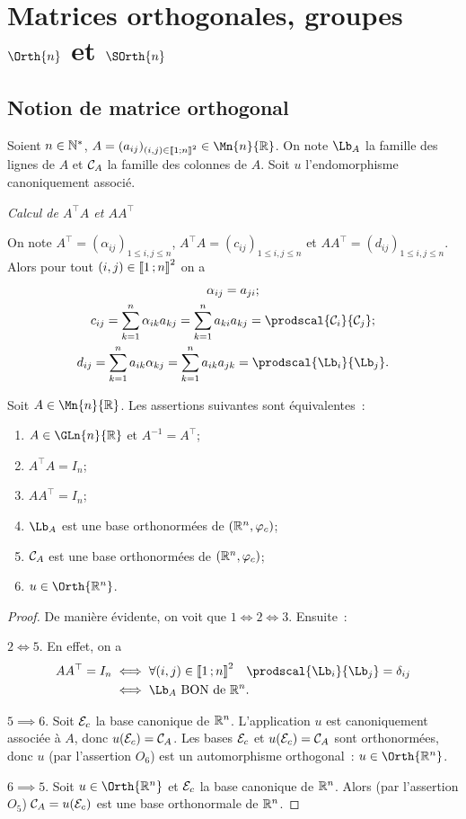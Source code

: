 \section{Matrices orthogonales, groupes $\Orth{n}$ et $\SOrth{n}$}

\subsection{Notion de matrice orthogonal}

Soient $n \in \mathbb{N}^*$, $A=(a_{ij})_{(i,j) \in \intervalleentier{1}{n}^2} \in \Mn{n}{\R}$. On note $\Lb_A$ la famille des lignes de $A$ et $\mathcal{C}_A$ la famille des colonnes de $A$. Soit $u$ l'endomorphisme canoniquement associé.

\emph{Calcul de $A^\top A$ et $A A^\top$}

On note $A^\top = (\alpha_{ij})_{1\leq i,j \leq n}$, $A^\top A= (c_{ij})_{1\leq i,j \leq n}$ et $A A^\top=(d_{ij})_{1\leq i,j \leq n}$. Alors pour tout $(i,j) \in \mathopen{\llbracket}1\mathclose{}\mathpunct{};n\mathclose{\rrbracket}^2$ on a
\begin{gather}
  \alpha_{ij}=a_{ji};\\
  c_{ij} = \sum_{k=1}^n \alpha_{ik}a_{kj}=\sum_{k=1}^n a_{ki}a_{kj} = \prodscal{\courbe_i}{\courbe_j};\\
 d_{ij} = \sum_{k=1}^n a_{ik}\alpha_{kj}=\sum_{k=1}^n a_{ik}a_{jk} = \prodscal{\Lb_i}{\Lb_j}.
\end{gather}
\begin{theo}
  Soit $A \in \Mn{n}{\R}$. Les assertions suivantes sont équivalentes~:
  \begin{enumerate}
  \item $A \in \GLn{n}{\R}$ et $A^{-1}=A^\top$;
  \item $A^\top A = I_n$;
  \item $A A^\top = I_n$;
  \item $\Lb_A$ est une base orthonormées de $(\mathbb{R}^n, \varphi_c)$;
  \item $\mathcal{C}_A$ est une base orthonormées de $(\mathbb{R}^n, \varphi_c)$;
  \item $u \in \Orth{\R^n}$.
  \end{enumerate}
\end{theo}
\begin{proof}
  De manière évidente, on voit que $1 \iff 2 \iff 3$. Ensuite~:

  $2 \iff 5$. En effet, on a
  \begin{align}
   A A^\top = I_n &\iff \forall (i,j) \in \intervalleentier{1}{n}^2 \quad \prodscal{\Lb_i}{\Lb_j}=\delta_{ij} \\
   &\iff \Lb_A \text{~BON de~} \R^n.
  \end{align}

  $5 \implies 6$. Soit $\mathcal{E}_c$ la base canonique de $\mathbb{R}^n$. L'application $u$ est canoniquement associée à $A$, donc $u(\mathcal{E}_c)=\mathcal{C}_A$. Les bases $\mathcal{E}_c$ et $u(\mathcal{E}_c)=\mathcal{C}_A$ sont orthonormées, donc $u$ (par l'assertion $O_6$) est un automorphisme orthogonal~: $u \in \Orth{\R^n}$.

  $6 \implies 5$. Soit $u \in \Orth{\R^n}$ et $\mathcal{E}_c$ la base canonique de $\mathbb{R}^n$. Alors (par l'assertion $O_5$) $\mathcal{C}_A = u(\mathcal{E}_c)$ est une base orthonormale de $\mathbb{R}^n$.
\end{proof}

